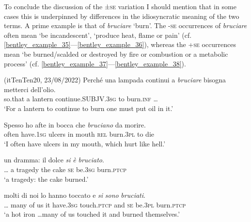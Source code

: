 \documentclass[output=paper,colorlinks,citecolor=brown
]{langscibook}
\begin{document}
To conclude the discussion of the ±\textsc{se} variation I should mention that in some cases this is underpinned by differences in the idiosyncratic meaning of the two terms. A prime example is that of \textit{bruciare} ‘burn’. The -\textsc{se} occurrences of \textit{bruciare} often mean ‘be incandescent’, ‘produce heat, flame or pain’ (cf. \ref{bentley_example_35}—\ref{bentley_example_36}), whereas the +\textsc{se} occurrences mean ‘be burned/scalded or destroyed by fire or combustion or a metabolic process’ (cf. \ref{bentley_example_37}—\ref{bentley_example_38}).

\hspace*{\fill}(itTenTen20, 23/08/2022)\quad
\ea \label{bentley_example_35}
    \gll Perché		una	lampada	continui											a 	\textit{bruciare} {bisogna metterci dell’olio.} \\
    	so.that		a				lantern			continue.SUBJV.3\textsc{sg}	to	burn.\textsc{inf} {\ldots} \\
    \glt 				‘For a lantern to continue to burn one must put oil in it.’
\z

\ea \label{bentley_example_36}
    \gll Spesso		ho						afte			in	bocca		che		\textit{bruciano}	da	morire. \\
    	often			have.1\textsc{sg}	ulcers	in	mouth	\textsc{rel}	burn.3\textsc{pl}		to		die \\
    \glt 				‘I often have ulcers in my mouth, which hurt like hell.’
\z

\ea \label{bentley_example_37}
    \gll  {\ldots}  un dramma: il		dolce \textit{si} \textit{	è }					\textit{bruciato}. \\
    	{\ldots} a			tragedy		the	cake		\textsc{se}		be.3\textsc{sg}	burn.\textsc{ptcp} \\
    \glt 	‘a tragedy: the cake burned.’
\z

\ea \label{bentley_example_38}
     molti di		noi	lo	hanno			toccato				e				\textit{si}	\textit{sono}			\textit{bruciati}. \\
    	{\ldots} many	of		us		it	have.3\textsc{sg}	touch.\textsc{ptcp}		and	\textsc{se}	be.3\textsc{pl}		burn.\textsc{ptcp} \\
    \glt ‘a hot iron  \ldots  many of us touched it and burned themselves.’	
\z
\end{document}

